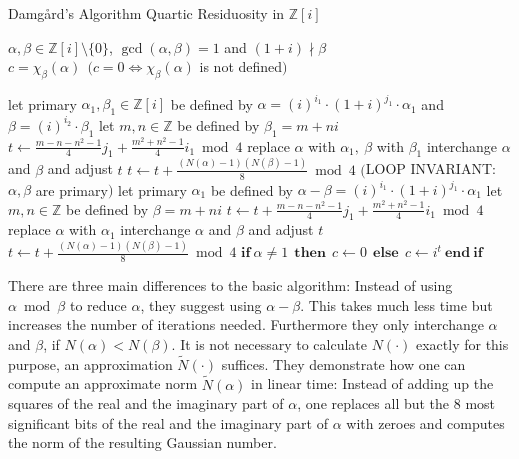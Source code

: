 \documentclass[a4paper, 11pt]{article}
\begin{document}
  \begin{algorithm}[htb] 
 \caption{Damg\aa rd's Algorithm Quartic Residuosity in $\mathbb{Z}[{i}]$} 
 \label{alg2} 
 \begin{algorithmic}[1] 
 \REQUIRE $\alpha,\beta \in \mathbb{Z}[{i}] \setminus \{0\}$, $\gcd(\alpha,\beta)=1$ 
 and $(1 + i) \nmid \beta$\\ 
 \ENSURE $c = \chi_{\beta}(\alpha)~~(c=0 \Leftrightarrow \chi_{\beta}(\alpha)$ is not defined$)$ 
 
 \STATE let primary $\alpha_1, \beta_1 \in \mathbb{Z}[{i}]$ be defined by\newline 
     $\alpha = (i)^{i_1} \cdot (1 + i)^{j_1}\cdot \alpha_1$ and\newline 
     $ \beta = (i)^{i_2} \cdot \beta_1$ 
 \STATE let $m, n \in \mathbb{Z}$ be defined by $\beta_1 = m + ni$ 
 \STATE $t\gets {\frac{m-n-n^{2}-1}{4}} {j_1}  +  {\frac{m^{2}+ n^{2} - 1}{4}}{i_1} \bmod 4$ 
 \STATE replace $\alpha$ with $\alpha_1, ~\beta$ with $\beta_1$ 
 \STATE interchange $\alpha$ and $\beta$ and adjust $t$ 
     \newline$t \gets t +  \frac{({N}(\alpha)-1)({N}(\beta)-1)}{8}\bmod 4$ 
 \ENDIF 
 \WHILE {$\alpha \ne \beta$ } 
 \STATE $($LOOP INVARIANT: $\alpha, \beta$ are primary$)$ 
 \STATE let primary $\alpha_1$ be defined by $\alpha - \beta = (i)^{i_1}\cdot (1 + i)^{j_1}\cdot \alpha_1$ 
 \STATE let $m, n \in \mathbb{Z}$ be defined by $\beta = m + ni$ 
 \STATE $t\gets t + {\frac{m-n-n^{2}-1}{4}} {j_1}  +  {\frac{m^{2}+ n^{2} - 1}{4}}{i_1} \bmod 4$ 
 \STATE replace $\alpha$ with $\alpha_1$ 
 \STATE interchange $\alpha$ and $\beta$ and adjust $t$ 
     \newline$t \gets t +  \frac{({N}(\alpha)-1)({N}(\beta)-1)}{8}\bmod 4$ 
 \ENDIF 
 \ENDWHILE 
 \STATE $\mathbf{if} { ~\alpha \ne 1 }  \mathbf{~~then~}~c \gets 0~\mathbf{~else~~} c \gets i^t ~\mathbf{end~ if}$ 
 
 \end{algorithmic} 
 \end{algorithm} 
 
 There are three main differences to the basic algorithm: Instead of using 
 $\alpha \bmod \beta$ to reduce $\alpha$, they suggest using $\alpha - \beta$. This takes much less time 
 but increases the number of iterations needed. Furthermore they only interchange $\alpha$ and $\beta$, if 
 $N(\alpha) < N(\beta)$. It is not necessary to calculate $N(\cdot)$ exactly for this purpose, 
 an approximation $\tilde{N}(\cdot)$ suffices. They demonstrate how one can compute an approximate norm $\tilde{N}(\alpha)$ in linear time: Instead of adding up the squares of the real and the imaginary part of $\alpha$, one replaces all but the 8 most significant bits of the real and the imaginary part of $\alpha$ with zeroes and computes the norm of the resulting Gaussian number. 
 
\end{document}
